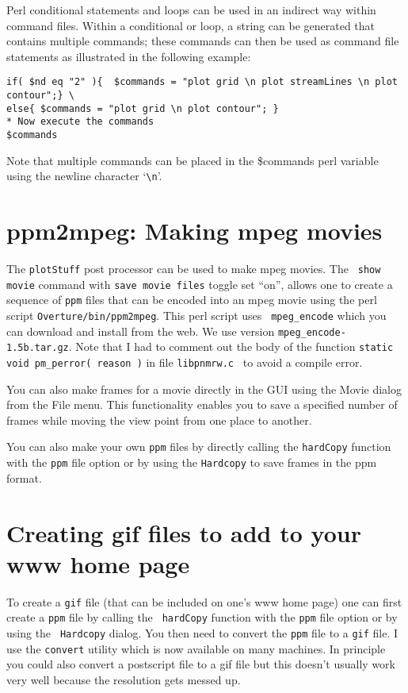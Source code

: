\documentclass{article}
\begin{document}
Perl conditional statements and loops can be used in an indirect way within
command files. Within a conditional or loop, a string can be generated that
contains multiple commands; these commands can then be used  as command file statements
as illustrated in the following example:
\begin{verbatim}
if( $nd eq "2" ){  $commands = "plot grid \n plot streamLines \n plot contour";} \
else{ $commands = "plot grid \n plot contour"; }
* Now execute the commands 
$commands
\end{verbatim}
Note that multiple commands can be placed in the \$commands perl variable using 
the newline character `\verb-\n-'.



\section{ppm2mpeg: Making mpeg movies} 

The {\tt plotStuff} post processor can be used to make mpeg movies.  The {\tt
show movie} command with {\tt save movie files} toggle set ``on'', allows one to
create a sequence of {\tt ppm} files that can be encoded into an mpeg movie
using the perl script {\tt Overture/bin/ppm2mpeg}.  This perl script uses {\tt
mpeg\_encode} which you can download and install from the web. We use version
{\tt mpeg\_encode-1.5b.tar.gz}.  Note that I had to comment out the body of the
function {\tt static void pm_perror( reason )} in file {\tt libpnmrw.c } to
avoid a compile error.


You can also make frames for a movie directly in the GUI using the
Movie dialog from the File menu. This functionality enables you to
save a specified number of frames while moving the view point from one
place to another.

You can also make your own {\tt ppm} files by directly calling the {\tt hardCopy}
function with the {\tt ppm} file option or by using the {\tt Hardcopy}
to save frames in the ppm format.


\section{Creating gif files to add to your www home page}

%
%
To create a {\tt gif} file (that can be included on one's www home
page) one can first create a {\tt ppm} file by calling the {\tt
hardCopy} function with the {\tt ppm} file option or by using the {\tt
Hardcopy} dialog. You then need to convert the {\tt ppm} file to a
{\tt gif} file. I use the {\tt convert} utility which is now available
on many machines. In principle you could also convert a postscript
file to a gif file but this doesn't usually work very well because the
resolution gets messed up.
\end{document}

